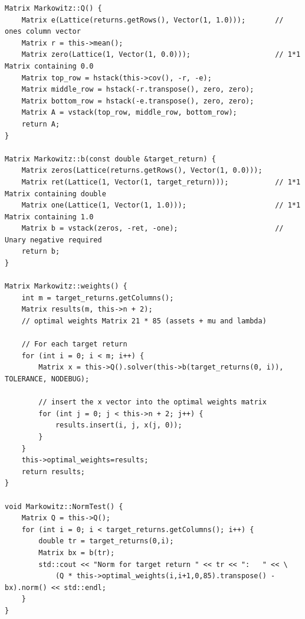 \documentclass[12pt,twoside]{article}
\begin{document}
\begin{verbatim}
Matrix Markowitz::Q() {
    Matrix e(Lattice(returns.getRows(), Vector(1, 1.0)));       // ones column vector
    Matrix r = this->mean();
    Matrix zero(Lattice(1, Vector(1, 0.0)));                    // 1*1 Matrix containing 0.0
    Matrix top_row = hstack(this->cov(), -r, -e);
    Matrix middle_row = hstack(-r.transpose(), zero, zero);
    Matrix bottom_row = hstack(-e.transpose(), zero, zero);
    Matrix A = vstack(top_row, middle_row, bottom_row);
    return A;
}

Matrix Markowitz::b(const double &target_return) {
    Matrix zeros(Lattice(returns.getRows(), Vector(1, 0.0)));
    Matrix ret(Lattice(1, Vector(1, target_return)));           // 1*1 Matrix containing double
    Matrix one(Lattice(1, Vector(1, 1.0)));                     // 1*1 Matrix containing 1.0
    Matrix b = vstack(zeros, -ret, -one);                       // Unary negative required
    return b;
}

Matrix Markowitz::weights() {
    int m = target_returns.getColumns();
    Matrix results(m, this->n + 2);                             
    // optimal weights Matrix 21 * 85 (assets + mu and lambda)

    // For each target return
    for (int i = 0; i < m; i++) {
        Matrix x = this->Q().solver(this->b(target_returns(0, i)), TOLERANCE, NODEBUG);

        // insert the x vector into the optimal weights matrix
        for (int j = 0; j < this->n + 2; j++) {
            results.insert(i, j, x(j, 0));
        }
    }
    this->optimal_weights=results;
    return results;
}

void Markowitz::NormTest() {
    Matrix Q = this->Q();
    for (int i = 0; i < target_returns.getColumns(); i++) {
        double tr = target_returns(0,i);
        Matrix bx = b(tr);
        std::cout << "Norm for target return " << tr << ":   " << \
            (Q * this->optimal_weights(i,i+1,0,85).transpose() - bx).norm() << std::endl;
    }
}
\end{verbatim}
\end{document}

